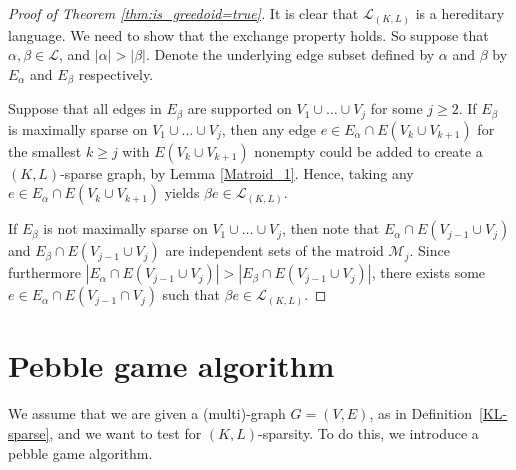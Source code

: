 \documentclass{article}
\begin{document}
\begin{proof}[Proof of Theorem \ref{thm:is_greedoid=true}]
It is clear that $\mathcal{L}_{(K,L)}$ is a hereditary language. We need to show that the exchange property holds.
So suppose that $\alpha, \beta \in \mathcal{L}$, and $\vert \alpha \vert > \vert \beta \vert.$  Denote the underlying edge subset defined by $\alpha$ and $\beta$ by $E_{\alpha}$ and $E_{\beta}$ respectively.

Suppose that all edges in $E_{\beta}$ are supported on $V_1\cup\dots \cup V_j$ for some $j\geq 2$. If $E_{\beta}$ is maximally sparse on $V_1\cup \dots\cup V_j$, then any edge $e \in E_\alpha \cap E(V_{k} \cup V_{k+1})$ for the smallest $k \geq j$ with $E(V_{k} \cup V_{k+1})$ nonempty could be added to create a $(K,L)$-sparse graph, by Lemma \ref{Matroid_1}. Hence, taking any $e \in E_\alpha \cap E(V_{k} \cup V_{k+1})$ yields $\beta e \in \mathcal{L}_{(K,L)}$.

If $E_{\beta}$ is not maximally sparse on $V_1\cup \dots \cup V_j$, then note that $E_{\alpha} \cap E(V_{j-1} \cup V_j)$ and $E_{\beta} \cap E(V_{j-1} \cup V_j)$ are independent sets of the matroid $\mathcal{M}_j$. Since furthermore $|E_{\alpha} \cap E(V_{j-1} \cup V_j)| > |E_{\beta} \cap E(V_{j-1} \cup V_j)|$, there exists some $e\in E_\alpha \cap E(V_{j-1} \cap V_j)$ such that $\beta e\in \mathcal{L}_{(K,L)}$. 
\end{proof}

\section{Pebble game algorithm}\label{sec:Algorithm}
We assume that we are given a (multi)-graph $G=(V,E)$, as in Definition~\ref{KL-sparse}, and we want to test for $(K,L)$-sparsity. To do this, we introduce a pebble game algorithm.
\end{document}
